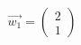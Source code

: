 \documentclass[preview]{standalone}
\begin{document}
\begin{align*}
\vec{w_1} = \begin{pmatrix} 2 \\ 1 \end{pmatrix}
\end{align*}
\end{document}
